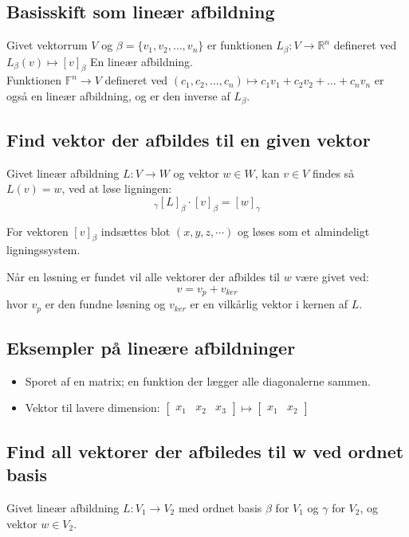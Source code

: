 \subsection{Basisskift som lineær afbildning}
Givet vektorrum $V$ og \( \beta = \{ v_1, v_2, \ldots, v_n \} \)
er funktionen \( L_\beta : V \rightarrow \mathbb{R}^n \) defineret ved
\(
L_\beta(v) \mapsto [v]_\beta
\)
En lineær afbildning. \\

Funktionen \(\mathbb{F}^n \to V\) defineret ved
\( (c_1, c_2, \ldots, c_n) \mapsto c_1 v_1 + c_2 v_2 + \ldots + c_n v_n\)
er også en lineær afbildning, og er den inverse af \( L_\beta \).


\subsection{Find vektor der afbildes til en given vektor}
Givet lineær afbildning \( L : V \rightarrow W \) og vektor \( w \in W \), kan \( v \in V \) findes så \( L(v) = w \), ved at løse ligningen:
\[
_\gamma [L]_\beta \cdot [v]_\beta = [w]_\gamma
\]

For vektoren \([v]_\beta\) indsættes blot $(x,y,z, \cdots)$ og løses som et almindeligt ligningssystem.

Når en løsning er fundet vil alle vektorer der afbildes til \( w \) være givet ved:
\[
    v = v_p + v_{ker}
\]
hvor \( v_p \) er den fundne løsning og \( v_{ker} \) er en vilkårlig vektor i kernen af \( L \). 


\subsection{Eksempler på lineære afbildninger}
\begin{itemize}
    \item Sporet af en matrix; en funktion der lægger alle diagonalerne sammen.
    
    \item Vektor til lavere dimension:
    \(
        \begin{bmatrix}
            x_1 & x_2 & x_3
        \end{bmatrix}
        \mapsto
        \begin{bmatrix}
            x_1 & x_2
        \end{bmatrix}
    \)
\end{itemize}

\subsection{Find all vektorer der afbiledes til w ved ordnet basis}
Givet lineær afbildning \(L: V_1 \to V_2\) med ordnet basis \(\beta\) for \(V_1\) og \(\gamma\) for \(V_2\), og vektor \(w \in V_2\).

